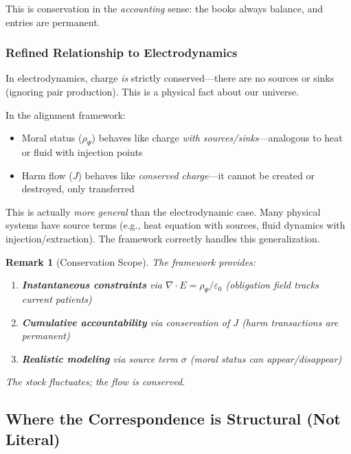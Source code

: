 \documentclass[12pt]{article}
\newtheorem{remark}[theorem]{Remark}
\begin{document}
This is conservation in the \emph{accounting} sense: the books always balance, and entries are permanent.

\subsubsection{Refined Relationship to Electrodynamics}

In electrodynamics, charge \emph{is} strictly conserved---there are no sources or sinks (ignoring pair production). This is a physical fact about our universe.

In the alignment framework:
\begin{itemize}
\item Moral status ($\rho_\Psi$) behaves like charge \emph{with sources/sinks}---analogous to heat or fluid with
injection points
\item Harm flow ($J$) behaves like \emph{conserved charge}---it cannot be created or destroyed, only transferred
\end{itemize}

This is actually \emph{more general} than the electrodynamic case. Many physical systems have source
terms (e.g., heat equation with sources, fluid dynamics with injection/extraction). The framework
correctly handles this generalization.

\begin{remark}[Conservation Scope]
\emph{The framework provides:}
\begin{enumerate}
\item \emph{\textbf{Instantaneous constraints} via $\nabla \cdot E = \rho_\Psi / \varepsilon_0$ (obligation field tracks current patients)}
\item \emph{\textbf{Cumulative accountability} via conservation of $J$ (harm transactions are permanent)}
\item \emph{\textbf{Realistic modeling} via source term $\sigma$ (moral status can appear/disappear)}
\end{enumerate}

\emph{The stock fluctuates; the flow is conserved.}
\end{remark}

\subsection{Where the Correspondence is Structural (Not Literal)}
\end{document}
